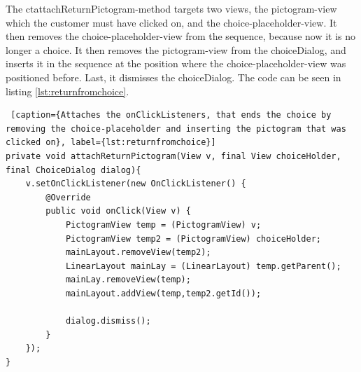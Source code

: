 The ct{attachReturnPictogram}-method targets two views, the pictogram-view which the customer must have clicked on, and the choice-placeholder-view. It then removes the choice-placeholder-view from the sequence, because now it is no longer a choice. It then removes the pictogram-view from the choiceDialog, and inserts it in the sequence at the position where the choice-placeholder-view was positioned before. Last, it dismisses the choiceDialog.  The code can be seen in listing \ref{lst:returnfromchoice}.

\begin{lstlisting} [caption={Attaches the onClickListeners, that ends the choice by removing the choice-placeholder and inserting the pictogram that was clicked on}, label={lst:returnfromchoice}]
private void attachReturnPictogram(View v, final View choiceHolder, final ChoiceDialog dialog){
	v.setOnClickListener(new OnClickListener() {
		@Override
		public void onClick(View v) {
			PictogramView temp = (PictogramView) v;
			PictogramView temp2 = (PictogramView) choiceHolder;
			mainLayout.removeView(temp2);
			LinearLayout mainLay = (LinearLayout) temp.getParent();
			mainLay.removeView(temp);
			mainLayout.addView(temp,temp2.getId());

			dialog.dismiss();
		}
	});
}
\end{lstlisting}



